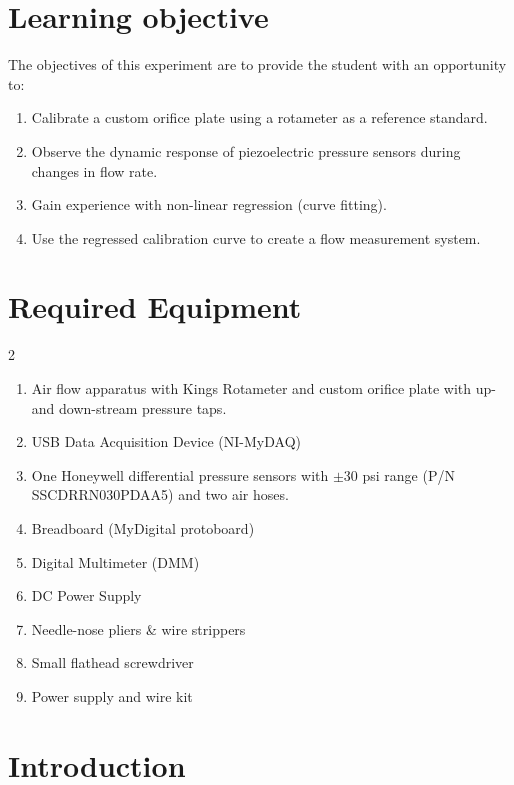 \documentclass{article} %
\begin{document}


\clearpage


\section{Learning objective}
The objectives of this experiment are to provide the student with an opportunity to:

\begin{enumerate}
    \item	Calibrate a custom orifice plate using a rotameter as a reference standard.
    \item	Observe the dynamic response of piezoelectric pressure sensors during changes in flow rate.
    \item	Gain experience with non-linear regression (curve fitting).
    \item	Use the regressed calibration curve to create a flow measurement system.
\end{enumerate}



\section{Required Equipment}
\begin{multicols}{2}
\begin{enumerate}
\item Air flow apparatus with Kings Rotameter and custom orifice plate with up- and down-stream pressure taps.
    \item USB Data Acquisition Device (NI-MyDAQ)
    \item One Honeywell differential pressure sensors with $\pm$30 psi range (P/N SSCDRRN030PDAA5) and two air hoses.
    \item Breadboard (MyDigital protoboard)
    \item Digital Multimeter (DMM)
    \item DC Power Supply
    \item Needle-nose pliers \& wire strippers
    \item Small flathead screwdriver
    \item Power supply and wire kit
\end{enumerate}
\end{multicols}

\section{Introduction}
\end{document}
